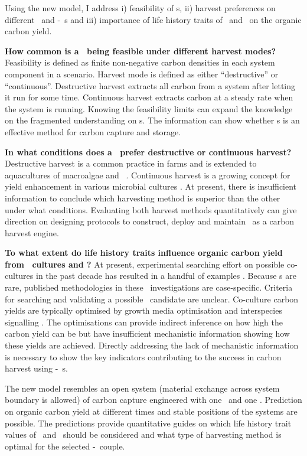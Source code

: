 \documentclass[../thesis.tex]{subfiles} %
\begin{document}
Using the new model, I address \Rn{1}) feasibility of \pbs s, \Rn{2}) harvest preferences on different \phy\ and \phy-\bac\ \pbs s and \Rn{3}) importance of life history traits of \phy\ and \bac\ on the organic carbon yield.

\textbf{How common is a \pbs\ being feasible under different harvest modes?}  Feasibility is defined as finite non-negative carbon densities in each system component in a scenario.  Harvest mode is defined as either ``destructive” or ``continuous”.  Destructive harvest extracts all carbon from a system after letting it run for some time.  Continuous harvest extracts carbon at a steady rate when the system is running.  Knowing the feasibility limits can expand the knowledge on the fragmented understanding \autocite{fuentes2016impact} on \pbs s.  The information can show whether \pbs s is an effective method for carbon capture and storage.

\textbf{In what conditions does a \pbs\ prefer destructive or continuous harvest?}  Destructive harvest is a common practice in farms and is extended to aquacultures of macroalgae \autocite{duarte2017can} and \phy\  \autocite{evanson_2019}.  Continuous harvest is a growing concept for yield enhancement in various microbial cultures \autocite{aytekin2016statistical,fuentes2016impact}.  At present, there is insufficient information to conclude which harvesting method is superior than the other under what conditions.  Evaluating both harvest methods quantitatively can give direction on designing protocols to construct, deploy and maintain \pbs\ as a carbon harvest engine.

\textbf{To what extent do life history traits influence organic carbon yield from \phy\ cultures and \pbs?}  At present, experimental searching effort on possible co-cultures in the past decade has resulted in a handful of examples \autocite{fuentes2016impact,santos2014microalgal}.  Because \pbs s are rare, published methodologies in these \pbs\ investigations are case-specific.  Criteria for searching and validating a possible \phy\/\bacm\ candidate are unclear.  Co-culture carbon yields are typically optimised by growth media optimisation \autocite{aytekin2016statistical,fuentes2016impact} and interspecies signalling \autocite{fuentes2016impact}.  The optimisations can provide indirect inference on how high the carbon yield can be but have insufficient mechanistic information showing how these yields are achieved.  Directly addressing the lack of mechanistic information is necessary to show the key indicators contributing to the success in carbon harvest using \phy-\bac\ \pbs s.

The new model resembles an open system (material exchange across system boundary is allowed) of carbon capture engineered with one \phy\ and one \bacm.  Prediction on organic carbon yield at different times and stable positions of the systems are possible.  The predictions provide quantitative guides on which life history trait values of \phy\ and \bac\ should be considered and what type of harvesting method is optimal for the selected \phy-\bac\ couple.
\end{document}
